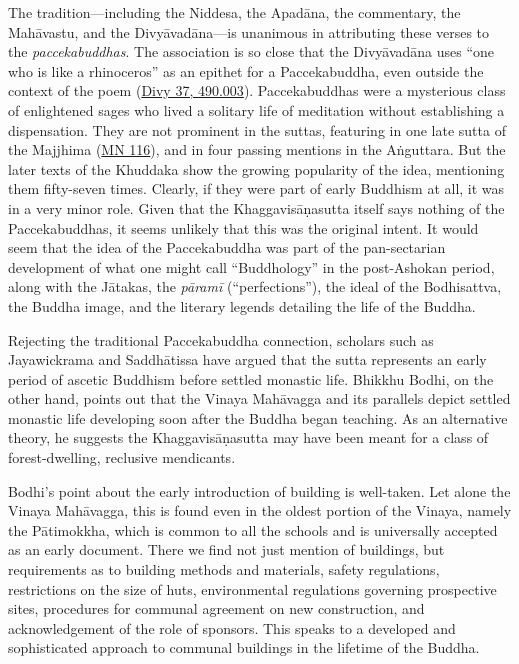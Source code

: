 \documentclass[12pt,openany]{book}%
\begin{document}
The tradition—including the Niddesa, the \textsanskrit{Apadāna}, the commentary, the \textsanskrit{Mahāvastu}, and the \textsanskrit{Divyāvadāna}—is unanimous in attributing these verses to the \textit{paccekabuddhas}. The association is so close that the \textsanskrit{Divyāvadāna} uses “one who is like a rhinoceros” as an epithet for a Paccekabuddha, even outside the context of the poem (\href{https://suttacentral.net/divy37/san/vaidya\#vai490.003}{Divy 37, 490.003}). Paccekabuddhas were a mysterious class of enlightened sages who lived a solitary life of meditation without establishing a dispensation. They are not prominent in the suttas, featuring in one late sutta of the Majjhima (\href{https://suttacentral.net/mn116/en/sujato}{MN 116}), and in four passing mentions in the \textsanskrit{Aṅguttara}. But the later texts of the Khuddaka show the growing popularity of the idea, mentioning them fifty-seven times. Clearly, if they were part of early Buddhism at all, it was in a very minor role. Given that the \textsanskrit{Khaggavisāṇasutta} itself says nothing of the Paccekabuddhas, it seems unlikely that this was the original intent. It would seem that the idea of the Paccekabuddha was part of the pan-sectarian development of what one might call “Buddhology” in the post-Ashokan period, along with the \textsanskrit{Jātakas}, the \textit{\textsanskrit{pāramī}} (“perfections”), the ideal of the Bodhisattva, the Buddha image, and the literary legends detailing the life of the Buddha.

Rejecting the traditional Paccekabuddha connection, scholars such as Jayawickrama and \textsanskrit{Saddhātissa} have argued that the sutta represents an early period of ascetic Buddhism before settled monastic life. Bhikkhu Bodhi, on the other hand, points out that the Vinaya \textsanskrit{Mahāvagga} and its parallels depict settled monastic life developing soon after the Buddha began teaching. As an alternative theory, he suggests the \textsanskrit{Khaggavisāṇasutta} may have been meant for a class of forest-dwelling, reclusive mendicants.

Bodhi’s point about the early introduction of building is well-taken. Let alone the Vinaya \textsanskrit{Mahāvagga}, this is found even in the oldest portion of the Vinaya, namely the \textsanskrit{Pātimokkha}, which is common to all the schools and is universally accepted as an early document. There we find not just mention of buildings, but requirements as to building methods and materials, safety regulations, restrictions on the size of huts, environmental regulations governing prospective sites, procedures for communal agreement on new construction, and acknowledgement of the role of sponsors. This speaks to a developed and sophisticated approach to communal buildings in the lifetime of the Buddha.
\end{document}
